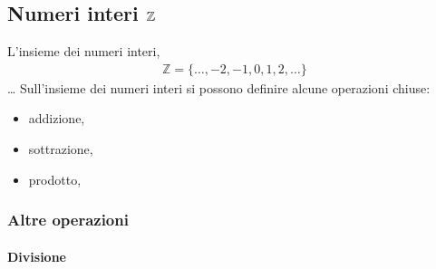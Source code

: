 \documentclass[letterpaper,10pt,italian]{jupyterBook}
\begin{document}
\subsection{Numeri interi \protect\(\mathbb{Z}\protect\)}
\label{\detokenize{ch/set/numeric-sets:numeri-interi-mathbb-z}}\label{\detokenize{ch/set/numeric-sets:sets-numeric-z}}
\sphinxAtStartPar
L’insieme dei numeri interi,
\begin{equation*}
\begin{split}\mathbb{Z} = \{ \dots, -2, -1, 0, 1, 2, \dots \} \,\end{split}
\end{equation*}
\sphinxAtStartPar
… Sull’insieme dei numeri interi si possono definire alcune operazioni chiuse:
\begin{itemize}
\item {} 
\sphinxAtStartPar
addizione,

\item {} 
\sphinxAtStartPar
sottrazione,

\item {} 
\sphinxAtStartPar
prodotto,

\end{itemize}


\subsubsection{Altre operazioni}
\label{\detokenize{ch/set/numeric-sets:id1}}

\paragraph{Divisione}
\label{\detokenize{ch/set/numeric-sets:id2}}
\end{document}
